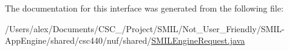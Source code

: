 The documentation for this interface was generated from the following file\-:\begin{DoxyCompactItemize}
\item 
/\-Users/alex/\-Documents/\-C\-S\-C\-\_/\-Project/\-S\-M\-I\-L/\-Not\-\_\-\-User\-\_\-\-Friendly/\-S\-M\-I\-L-\/\-App\-Engine/shared/csc440/nuf/shared/\hyperlink{_s_m_i_l_engine_request_8java}{S\-M\-I\-L\-Engine\-Request.\-java}\end{DoxyCompactItemize}

